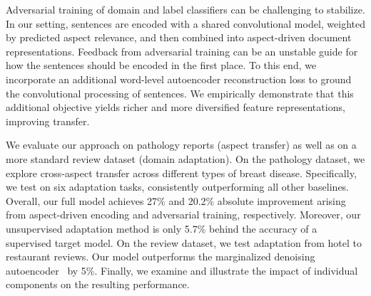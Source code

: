 
Adversarial training of domain and label classifiers can be challenging to stabilize. In our setting, sentences are encoded with a shared convolutional model, weighted by predicted aspect relevance, and then combined into aspect-driven document representations. Feedback from adversarial training can be an unstable guide for how the sentences should be encoded in the first place. To this end, we incorporate an additional word-level autoencoder reconstruction loss to ground the convolutional processing of sentences. We empirically demonstrate that this additional objective yields richer and more diversified feature representations, improving transfer. 

We evaluate our approach on pathology reports (aspect transfer) as well as on a more standard review dataset (domain adaptation). On the pathology dataset, we explore cross-aspect transfer across different types of breast disease. Specifically, we test on six adaptation tasks, consistently outperforming all other baselines. Overall, our full model achieves 27\% and 20.2\% absolute improvement arising from aspect-driven encoding and adversarial training, respectively. Moreover, our unsupervised adaptation method is only 5.7\% behind the accuracy of a supervised target model. On the review dataset, we test adaptation from hotel to restaurant reviews.
Our model outperforms the marginalized denoising autoencoder~\cite{chen2012marginalized} by 5\%.
Finally, we examine and illustrate the impact of individual components on the resulting performance. 


